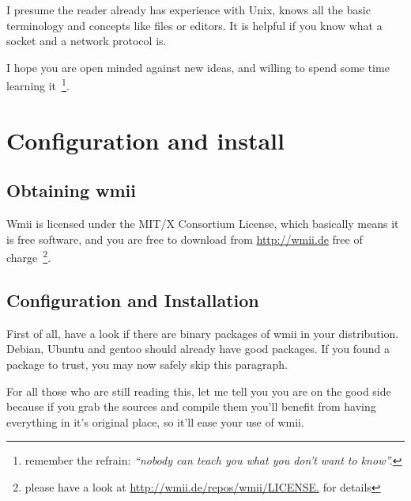 \documentclass[12pt,a4paper]{article} %
\newcommand{\hrefx}[1]{\href{#1}{#1}} %
\begin{document}
    I presume the reader already has experience with Unix, knows all
    the basic terminology and concepts like files or editors. It is
    helpful if you know what a socket and a network protocol is.

    I hope you are open minded against new ideas, and willing to spend
    some time learning it~\footnote{remember the refrain:
    \emph{``nobody can teach you what you don't want to know''.}}.
  
\section{Configuration and install}

  \subsection{Obtaining wmii}

    Wmii is licensed under the MIT/X Consortium License, which
    basically means it is free software, and you are free to download
    from \hrefx{http://wmii.de} free of charge~\footnote{ please have
    a look at \hrefx{http://wmii.de/repos/wmii/LICENSE.}  for
    details}.
  
  \subsection{Configuration and Installation}
  
    First of all, have a look if there are binary packages of wmii in
    your distribution. Debian, Ubuntu and gentoo should already have
    good packages. If you found a package to trust, you may now safely
    skip this paragraph.

    For all those who are still reading this, let me tell you you are
    on the good side because if you grab the sources and compile them
    you'll benefit from having everything in it's original place, so
    it'll ease your use of wmii.
    
\end{document}
